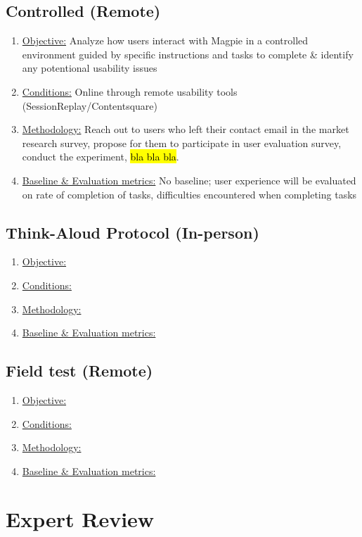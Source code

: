 \documentclass{report}
\begin{document}
\subsection{Controlled (Remote)}
\begin{enumerate}
    \item \underline{Objective:} Analyze how users interact with Magpie in a
    controlled environment guided by specific instructions and tasks to complete
    \& identify any potentional usability issues
    \item \underline{Conditions:} Online through remote usability tools
    (SessionReplay/Contentsquare)
    \item \underline{Methodology:} Reach out to users who left their contact
    email in the market research survey, propose for them to participate in user
    evaluation survey, conduct the experiment, \hl{bla bla bla}.
    \item \underline{Baseline \& Evaluation metrics:} No baseline; user
    experience will be evaluated on rate of completion of tasks, difficulties
    encountered when completing tasks
\end{enumerate}
\subsection{Think-Aloud Protocol (In-person)}
\begin{enumerate}
    \item \underline{Objective:}
    \item \underline{Conditions:}
    \item \underline{Methodology:}
    \item \underline{Baseline \& Evaluation metrics:}
\end{enumerate}
\subsection{Field test (Remote)}
\begin{enumerate}
    \item \underline{Objective:}
    \item \underline{Conditions:}
    \item \underline{Methodology:}
    \item \underline{Baseline \& Evaluation metrics:}
\end{enumerate}

\section{Expert Review}
\end{document}
